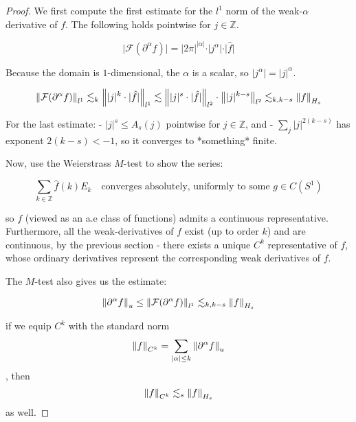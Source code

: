\documentclass[../main-manifolds.tex]{subfiles}
\begin{document}
\begin{proof}
We first compute the first estimate for the $l^1$ norm of the weak-$\alpha$ derivative of $f$. The following holds pointwise for $j\in\mathbb{Z}$.

$$
\vert\mathcal{F}(\partial^\alpha f)\vert = \vert 2\pi\vert^{\vert\alpha\vert}\cdot\vert j^\alpha\vert\cdot\vert \hat{f}\vert
$$

Because the domain is $1$-dimensional, the $\alpha$ is a scalar, so $\vert j^\alpha\vert = \vert j\vert^\alpha$. 

$$
\norm{\mathcal{F}(\partial^\alpha f)}_{l^1}\lesssim_k \norm{\vert j\vert^k\cdot\vert \hat{f}\vert}_{l^1}\lesssim \left\lVert {\vert j\vert^s\cdot\vert\hat{f}\vert} \right\rVert_{l^2}\cdot\left\lVert {\vert j\vert^{k-s}} \right\rVert_{l^2}\lesssim_{k,k-s}\norm{f}_{H_s}
$$

For the last estimate: 
- $\vert j\vert^s\leq A_s(j)$ pointwise for $j\in\mathbb{Z}$, and
- $\sum_{j}\vert j\vert^{2(k-s)}$ has exponent $2(k-s)<-1$, so it converges to *something* finite.

Now, use the Weierstrass $M$-test to show the series:

$$
\sum_{k\in\mathbb{Z}}\hat{f}(k)E_k\quad\text{converges absolutely, uniformly to some }g\in C(S^1)
$$

so $f$ (viewed as an a.e class of functions) admits a continuous representative. Furthermore, all the weak-derivatives of $f$ exist (up to order $k$) and are continuous, by the previous section - there exists a unique $C^k$ representative of $f$, whose ordinary derivatives represent the corresponding weak derivatives of $f$.

The $M$-test also gives us the estimate:

$$
\norm{\partial^\alpha f}_u\leq\norm{\mathcal{F}(\partial^\alpha f)}_{l^1}\lesssim_{k,k-s} \norm{f}_{H_s}
$$

if we equip $C^k$ with the standard norm $$\norm{f}_{C^k} = \sum_{\vert\alpha\vert\leq k}\norm{\partial^\alpha f}_u$$, then $$\norm{f}_{C^k}\lesssim_s \norm{f}_{H_s}$$ as well.
    
\end{proof}
\end{document}
